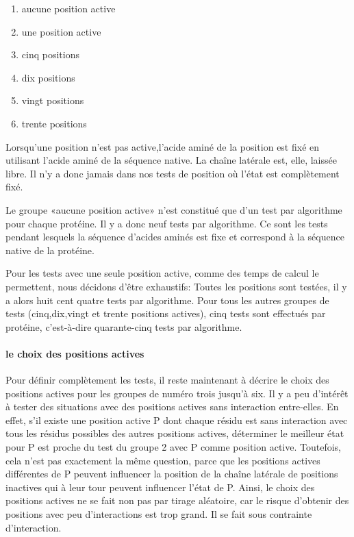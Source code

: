\begin{enumerate}
\item aucune position active
\item une position active 
\item cinq positions 
\item dix  positions 
\item vingt positions 
\item trente positions 
\end{enumerate}

Lorsqu'une position n'est pas active,l'acide aminé de la position est fixé en utilisant l'acide aminé de la séquence native. La chaîne latérale est, elle, laissée libre. Il n'y a donc jamais dans nos tests de position où l'état est complètement fixé.

Le groupe «aucune position active» n'est constitué que d'un test par algorithme pour chaque protéine. Il y a donc neuf tests par algorithme.
Ce sont les tests pendant lesquels la séquence d'acides aminés est fixe et correspond à la séquence native de la protéine.

Pour les tests avec une seule position active, comme des temps de calcul le permettent, nous décidons d'être exhaustifs:
Toutes les positions sont testées, il y a alors huit cent quatre tests par algorithme.
Pour tous les autres groupes de tests (cinq,dix,vingt et trente positions actives), cinq tests sont effectués par protéine, c'est-à-dire quarante-cinq tests par algorithme.

\paragraph{le choix des positions actives}
\label{para:choix_posi}
Pour définir complètement les tests, il reste maintenant à décrire le choix des positions actives pour les groupes de numéro trois jusqu'à six.
Il y a peu d'intérêt à tester des situations avec des positions actives sans interaction entre-elles.
En effet, s'il existe une position active P dont chaque résidu est sans interaction avec tous les résidus possibles des autres positions actives, déterminer le meilleur état pour P est proche du test du groupe 2 avec P comme position active. Toutefois, cela n'est pas exactement la même question, parce que les positions actives différentes de P peuvent influencer la position de la chaîne latérale de positions inactives qui à leur tour peuvent influencer l'état de P.
Ainsi, le choix des positions actives ne se fait non pas par tirage aléatoire, car le risque d'obtenir des positions avec peu d'interactions est trop grand. Il se fait sous contrainte d'interaction.

